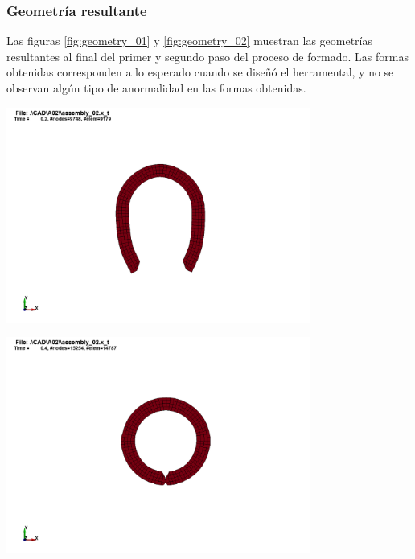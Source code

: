 \subsubsection{Geometría resultante}



Las figuras \ref{fig:geometry_01} y \ref{fig:geometry_02} muestran las geometrías 
resultantes al final del primer y segundo paso del proceso de formado. Las formas 
obtenidas corresponden a lo esperado cuando se diseñó el herramental, y no se observan 
algún tipo de anormalidad en las formas obtenidas.

\begin{center}
\includegraphics[width=0.75\textwidth]{src/ch4/geometry_01.png}
\label{fig:geometry_01}
\end{center}

\begin{center}
\includegraphics[width=0.75\textwidth]{src/ch4/geometry_02.png}
\label{fig:geometry_02}
\end{center}


